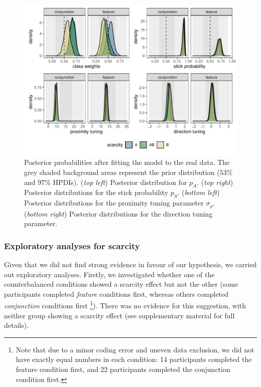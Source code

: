 \documentclass[12pt]{article}
\begin{document}
\begin{figure}[H]
    \centering
    \includegraphics[width=\textwidth]{figs/real_data.pdf}
    \caption{Posterior probabilities after fitting the model to the real data. The grey shaded background areas represent the prior distribution ($53\%$ and $97\%$ HPDIs). (\textit{top left}) Posterior distribution for $p_A$. (\textit{top right}) Posterior distributions for the stick probability $p_S$. (\textit{bottom left}) Posterior distributions for the proximity tuning parameter $\sigma_{\rho}$. (\textit{bottom right}) Posterior distributions for the direction tuning parameter.}
    \label{fig:real_data}
\end{figure}

\subsubsection{Exploratory analyses for scarcity}

Given that we did not find strong evidence in favour of our hypothesis, we carried out exploratory analyses. Firstly, we investigated whether one of the counterbalanced conditions showed a scarcity effect but not the other (some participants completed \textit{feature} conditions first, whereas others completed \textit{conjunction} conditions first \footnote{Note that due to a minor coding error and uneven data exclusion, we did not have exactly equal numbers in each condition: 14 participants completed the feature condition first, and 22 participants completed the conjunction condition first.}). There was no evidence for this suggestion, with neither group showing a scarcity effect (see supplementary material for full details). 
\end{document}
